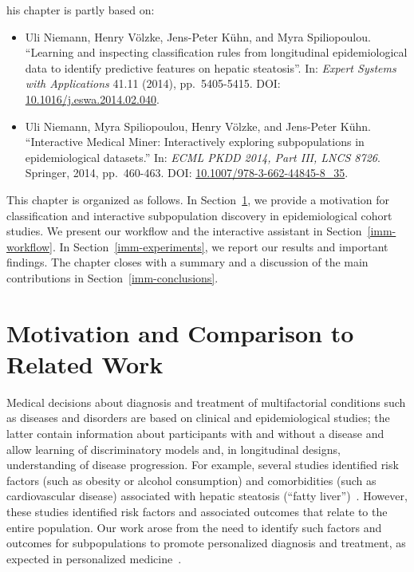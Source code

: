 \documentclass[
  oneside]{book}
\providecommand{\tightlist}{%
  \setlength{\itemsep}{0pt}\setlength{\parskip}{0pt}}
\newenvironment{infobox}[1]
  {
  \begin{chapter-summary}
  }
  {
  \end{chapter-summary}
  }
\begin{document}
\begin{infobox}

This chapter is partly based on:

\begin{itemize}
\tightlist
\item
  Uli Niemann, Henry Völzke, Jens-Peter Kühn, and Myra Spiliopoulou. ``Learning and inspecting classification rules from longitudinal epidemiological data to identify predictive features on hepatic steatosis''. In: \emph{Expert Systems with Applications} 41.11 (2014), pp.~5405-5415. DOI: \href{https://doi.org/10.1016\%2Fj.eswa.2014.02.040}{10.1016/j.eswa.2014.02.040}.
\item
  Uli Niemann, Myra Spiliopoulou, Henry Völzke, and Jens-Peter Kühn. ``Interactive Medical Miner: Interactively exploring subpopulations in epidemiological datasets.'' In: \emph{ECML PKDD 2014, Part III, LNCS 8726}. Springer, 2014, pp.~460-463. DOI: \href{https://doi.org/10.1007\%2F978-3-662-44845-8_35}{10.1007/978-3-662-44845-8\_35}.
\end{itemize}

\end{infobox}

This chapter is organized as follows.
In Section~\ref{imm-intro}, we provide a motivation for classification and interactive subpopulation discovery in epidemiological cohort studies.
We present our workflow and the interactive assistant in Section~\ref{imm-workflow}.
In Section~\ref{imm-experiments}, we report our results and important findings.
The chapter closes with a summary and a discussion of the main contributions in Section~\ref{imm-conclusions}.

\hypertarget{imm-intro}{%
\section{Motivation and Comparison to Related Work}\label{imm-intro}}

Medical decisions about diagnosis and treatment of multifactorial conditions such as diseases and disorders are based on clinical and epidemiological studies; the latter contain information about participants with and without a disease and allow learning of discriminatory models and, in longitudinal designs, understanding of disease progression.
For example, several studies identified risk factors (such as obesity or alcohol consumption) and comorbidities (such as cardiovascular disease) associated with hepatic steatosis (``fatty liver'')~\autocite{IttermannEtAl:Thyroid2012,LauEtAl:2010,StickelEtAl:2011,Targher:2010,Markus:2013}.
However, these studies identified risk factors and associated outcomes that relate to the entire population.
Our work arose from the need to identify such factors and outcomes for subpopulations to promote personalized diagnosis and treatment, as expected in personalized medicine~\autocite{Hingorani:2013,Voelzke:Cardiol2013}.
\end{document}
